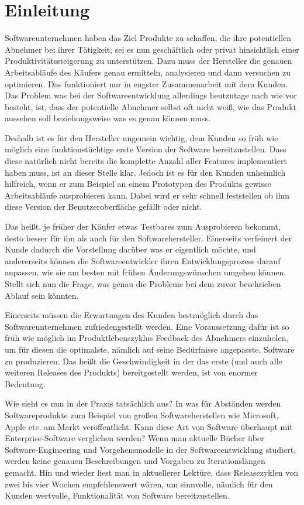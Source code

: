 \section{Einleitung}
\label{sec:einleitung}
Softwareunternehmen haben das Ziel Produkte zu schaffen, die ihre potentiellen Abnehmer bei ihrer Tätigkeit, sei es nun geschäftlich oder privat hinsichtlich einer Produktivitätssteigerung zu unterstützen. Dazu muss der Hersteller die genauen Arbeitsabläufe des Käufers genau ermitteln, analysieren und dann versuchen zu optimieren. Das funktioniert nur in engster Zusammenarbeit mit dem Kunden. Das Problem was bei der Softwareentwicklung allerdings heutzutage nach wie vor besteht, ist, dass der potentielle Abnehmer selbst oft nicht weiß, wie das Produkt aussehen soll beziehungsweise was es genau können muss. 

Deshalb ist es für den Hersteller ungemein wichtig, dem Kunden so früh wie möglich eine funktionstüchtige erste Version der Software bereitzustellen. Dass diese natürlich nicht bereits die komplette Anzahl aller Features implementiert haben muss, ist an dieser Stelle klar. Jedoch ist es für den Kunden unheimlich hilfreich, wenn er zum Beispiel an einem Prototypen des Produkts gewisse Arbeitsabläufe ausprobieren kann. Dabei wird er sehr schnell feststellen ob ihm diese Version der Benutzeroberfläche gefällt oder nicht. 

Das heißt, je früher der Käufer etwas Testbares zum Ausprobieren bekommt, desto besser für ihn als auch für den Softwarehersteller. Einerseits verfeinert der Kunde dadurch die Vorstellung darüber was er eigentlich möchte, und andererseits können die Softwareentwickler ihren Entwicklungsprozess darauf anpassen, wie sie am besten mit frühen Änderungswünschen umgehen können. Stellt sich nun die Frage, was genau die Probleme bei dem zuvor beschrieben Ablauf sein könnten. 

Einerseits müssen die Erwartungen des Kunden bestmöglich durch das Softwareunternehmen zufriedengestellt werden. Eine Voraussetzung dafür ist so früh wie möglich im Produktlebenszyklus Feedback des Abnehmers einzuholen, um für diesen die optimalste, nämlich auf seine Bedürfnisse angepasste, Software zu produzieren. Das heißt die Geschwindigkeit in der das erste (und auch alle weiteren Releases des Produkts) bereitgestellt werden, ist von enormer Bedeutung. 

Wie sieht es nun in der Praxis tatsächlich aus? In was für Abständen werden Softwareprodukte zum Beispiel von großen Softwareherstellen wie Microsoft, Apple etc. am Markt veröffentlicht. Kann diese Art von Software überhaupt mit Enterprise-Software verglichen werden? Wenn man aktuelle Bücher über Software-Engineering und Vorgehensmodelle in der Softwareentwicklung studiert, werden keine genauen Beschreibungen und Vorgaben zu Iterationslängen gemacht. Hin und wieder liest man in aktuellerer Lektüre, dass Releasezyklen von zwei bis vier Wochen empfehlenswert wären, um sinnvolle, nämlich für den Kunden wertvolle, Funktionalität von Software bereitzustellen. 

